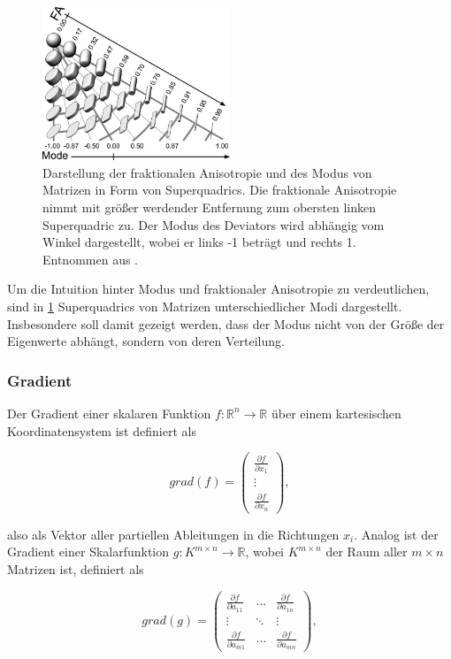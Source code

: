 \documentclass[a4paper,fontsize=12pt,toc=bib,parskip=half,ngerman]{scrartcl}
\begin{document}
\begin{figure}
	\centering
	\includegraphics[width=0.5\textwidth]{pictures/001.png}
	\caption{Darstellung der fraktionalen Anisotropie und des Modus von Matrizen in Form von Superquadrics\cite{kindlmann2004superquadric}. Die fraktionale Anisotropie nimmt mit gr\"o{\ss}er werdender Entfernung zum obersten linken Superquadric zu. Der Modus des Deviators wird abh\"angig vom Winkel dargestellt, wobei er links -1 betr\"agt und rechts 1. Entnommen aus \cite[S.~140]{ennis2006orthogonal}.}
	\label{Modus}
\end{figure}
Um die Intuition hinter Modus und fraktionaler Anisotropie zu verdeutlichen, sind in \cref{Modus} Superquadrics von Matrizen unterschiedlicher Modi dargestellt. Insbesondere soll damit gezeigt werden, dass der Modus nicht von der Gr\"o{\ss}e der Eigenwerte abh\"angt, sondern von deren Verteilung.

\subsubsection{Gradient}
Der Gradient einer skalaren Funktion $f: \mathbb{R}^n \rightarrow \mathbb{R}$  \"uber einem kartesischen Koordinatensystem ist definiert als

\begin{equation}
	grad(f) = 	
	\begin{pmatrix}
		\frac{\partial f}{\partial x_1} \\
		\vdots \\
		\frac{\partial f}{\partial x_n}
	\end{pmatrix},
\end{equation}

also als Vektor aller partiellen Ableitungen in die Richtungen $x_i$. Analog ist der Gradient einer Skalarfunktion $g: K^{m\times n} \rightarrow \mathbb{R}$, wobei $K^{m\times n}$ der Raum aller $m\times n$ Matrizen ist, definiert als

\begin{equation}
	grad(g) =
	\begin{pmatrix}
		\frac{\partial f}{\partial a_{11}} & \dots & \frac{\partial f}{\partial a_{1n}}  \\
		\vdots & \ddots & \vdots \\
		\frac{\partial f}{\partial a_{m1}} & \dots & \frac{\partial f}{\partial a_{mn}} 
	\end{pmatrix},
\end{equation}
\end{document}
